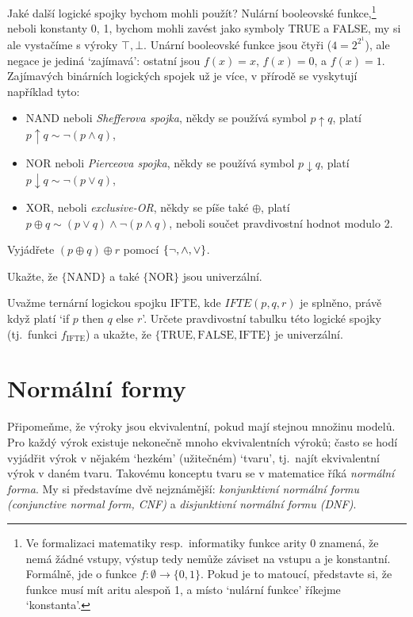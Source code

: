 Jaké další logické spojky bychom mohli použít? Nulární booleovské funkce,\footnote{Ve formalizaci matematiky resp.\ informatiky funkce arity 0 znamená, že nemá žádné vstupy, výstup tedy nemůže záviset na vstupu a je konstantní. Formálně, jde o funkce $f\colon \emptyset\to \{0,1\}$. Pokud je to matoucí, představte si, že funkce musí mít aritu alespoň 1, a místo `nulární funkce' říkejme `konstanta'.} neboli konstanty 0, 1, bychom mohli zavést jako symboly TRUE a FALSE, my si ale vystačíme s výroky $\top,\bot$.  Unární booleovské funkce jsou čtyři ($4=2^{2^1}$), ale negace je jediná `zajímavá': ostatní jsou $f(x)=x$, $f(x)=0$, a $f(x)=1$. Zajímavých binárních logických spojek už je více, v přírodě se vyskytují například tyto:
\begin{itemize}
    \item NAND neboli \emph{Shefferova spojka},  někdy se používá symbol $p\uparrow q$, platí $p\uparrow q \sim \neg (p\land q)$,
    \item NOR neboli \emph{Pierceova spojka},  někdy se používá symbol $p\downarrow q$, platí $p\downarrow q \sim \neg (p\lor q)$,
    \item XOR, neboli \emph{exclusive-OR}, někdy se píše také $\oplus$, platí $p\oplus q \sim (p\lor q)\land\neg(p\land q)$, neboli součet pravdivostní hodnot modulo 2.
\end{itemize}

\begin{exercise}
    Vyjádřete $(p\oplus q)\oplus r$ pomocí $\{\neg, {\land},{\lor}\}$.
\end{exercise}

\begin{exercise}
    Ukažte, že $\{\mathrm{NAND}\}$ a také $\{\mathrm{NOR}\}$ jsou univerzální.
\end{exercise}

\begin{exercise}
Uvažme ternární logickou spojku $\mathrm{IFTE}$, kde $IFTE(p,q,r)$ je splněno, právě když platí `if $p$ then $q$ else $r$'. Určete pravdivostní tabulku této logické spojky (tj.\ funkci $f_\mathrm{IFTE}$) a ukažte, že $\{\mathrm{TRUE}, \mathrm{FALSE},\mathrm{IFTE}\}$ je univerzální.
\end{exercise}


\section{Normální formy}

Připomeňme, že výroky jsou ekvivalentní, pokud mají stejnou množinu modelů. Pro každý výrok existuje nekonečně mnoho ekvivalentních výroků; často se hodí vyjádřit výrok v nějakém `hezkém' (užitečném) `tvaru', tj.\ najít ekvivalentní výrok v daném tvaru. Takovému konceptu tvaru se v matematice říká \emph{normální forma}. My si představíme dvě nejznámější: \emph{konjunktivní normální formu (conjunctive normal form, CNF)} a \emph{disjunktivní normální formu (DNF)}.

